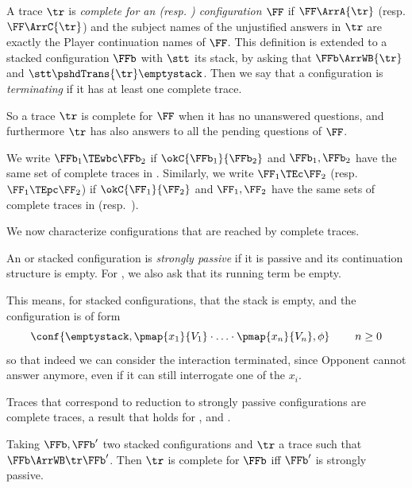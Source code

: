 \begin{definition}
\label{def:ctrace}
 A trace $\tr$ 
 is \emph{complete for an \AOGS (resp. \COGS) configuration $\FF$} if
 $\FF \ArrA{\tr}$ (resp. $\FF \ArrC{\tr}$) 
 and the subject names of the unjustified answers in $\tr$
 are exactly the Player continuation names of $\FF$.
 This definition is extended to a stacked configuration $\FFb$
 with $\stt$ its stack,
 by asking that $\FFb \ArrWB{\tr}$ and $\stt \pshdTrans{\tr} \emptystack$.
 Then we say that a configuration is \emph{terminating} 
 if it has at least one complete trace.
\end{definition}
\noindent
So a trace $\tr$ is complete for $\FF$ when it has no unanswered questions,
and furthermore $\tr$ has also answers to all the pending questions of $\FF$.


\begin{definition}
  \label{d:TEwbcN}
  We write $\FFb_1 \TEwbc \FFb_2$ if
  $\okC{\FFb_1}{\FFb_2}$
  and $\FFb_1,\FFb_2$ have the same set of complete traces in \WBOGS. 
%
  Similarly, we write $\FF_1 \TEc \FF_2$ (resp.\ $\FF_1 \TEpc \FF_2$)
  if $\okC{\FF_1}{\FF_2}$ 
  and $\FF_1,\FF_2$ have the same 
  sets of complete traces in \AOGS (resp.\ \COGS).
\end{definition} 

We now characterize configurations that are reached
by complete traces.

\begin{definition}
  \label{d:sp}
  An \AOGS or stacked configuration
  is \emph{strongly passive} if it is passive and its 
  continuation structure is empty.
  For \COGS, we also ask that its running term be empty.
\end{definition}
\noindent
This means, for stacked configurations,
that the stack is empty, and the configuration is of form
\[   
    \conf{\emptystack, 
      \pmap{x_1}{V_1}\cdot \ldots \cdot  \pmap{x_n}{V_n},\phi} \hskip .8cm n\geq 0 \]
so that indeed we can consider the interaction terminated, since Opponent
cannot answer anymore, even if it can still interrogate one of the $x_i$.

Traces that correspond to reduction to strongly passive configurations 
are complete traces, a result that holds for \WBOGS, \AOGS and \COGS.
  
\begin{lemma}
\label{l:WBOGS_complete-strongly-passive}
  Taking $\FFb,\FFb'$ two stacked configurations 
  and $\tr$ a trace such that $\FFb \ArrWB \tr \FFb'$.  
  Then $\tr$ is complete for $\FFb$
  iff $\FFb'$ is strongly passive.
\end{lemma}

